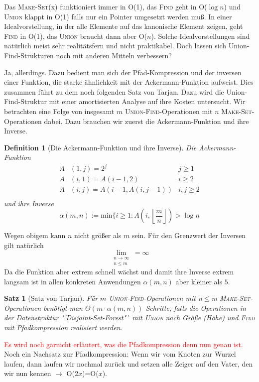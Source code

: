 \documentclass[ngerman,draft,parskip=half*,twoside]{scrreprt}
\theoremstyle{break}
\newtheorem{definition}{Definition}
\newtheorem{satz}{Satz}
\begin{document}
Das \textsc{Make-Set}(x) funktioniert immer in O(1), das \textsc{Find} geht in O($\log n$) und \textsc{Union} klappt in
O(1) falls nur ein Pointer umgesetzt werden muß. In einer Idealvorstellung, in der alle Elemente auf das kanonische
Element zeigen, geht \textsc{Find} in O(1), das \textsc{Union} braucht dann aber O($n$). Solche Idealvorstellungen sind
natürlich meist sehr realitätsfern und nicht praktikabel. Doch lassen sich Union-Find-Strukturen noch mit anderen
Mitteln verbessern?

Ja, allerdings. Dazu bedient man sich der Pfad-Kompression und der inversen einer Funktion, die starke ähnlichkeit mit
der Ackermann-Funktion aufweist. Dies zusammen führt zu dem noch folgenden Satz von Tarjan. Dazu wird die
Union-Find-Struktur mit einer amortisierten Analyse auf ihre Kosten untersucht. Wir betrachten eine Folge von insgesamt 
$m$ \textsc{Union-Find}-Operationen mit $n$ \textsc{Make-Set}-Operationen dabei. Dazu brauchen wir zuerst die
Ackermann-Funktion und ihre Inverse.
\begin{definition}[Die Ackermann-Funktion und ihre Inverse]
 Die Ackermann-Funktion
 \begin{align*}
 A&(1,j)=2^j   & j\geq 1\\
 A&(i,1)=A(i-1,2)   & i\geq 2\\
 A&(i,j)=A(i-1, A(i,j-1))   & i,j \geq 2\\
 \end{align*}
 und ihre Inverse
 \[\alpha(m,n):=\mbox{min}\{i \geq 1 : A\left(i,\left\lfloor\frac{m}{n}\right\rfloor\right)> \log n\]
\end{definition}
Wegen obigem kann $n$ nicht größer als $m$ sein. Für den Grenzwert der Inversen gilt natürlich
\[\lim_{\substack{n \rightarrow \infty \\n \leq m }}=\infty\]
Da die Funktion aber extrem schnell wächst und damit ihre Inverse extrem langsam ist in allen konkreten Anwendungen 
$\alpha (m,n)$ aber kleiner als $5$. 

\begin{satz}[Satz von Tarjan]
Für $m$ \textsc{Union-Find}-Operationen mit n$\leq$m \textsc{Make-Set}-Operationen benötigt man $\Theta( m \cdot
\alpha(m,n))$ Schritte, falls die Operationen in der Datenstruktur "'Disjoint-Set-Forest"` mit \textsc{Union} nach
Größe (Höhe) und \textsc{Find} mit Pfadkompression realisiert werden.
\end{satz}
\textcolor{red}{Es wird noch garnicht erläutert, was die Pfadkompression denn nun genau ist.}
Noch ein Nachsatz zur Pfadkompression: Wenn wir vom Knoten zur Wurzel laufen, dann laufen wir nochmal zurück und setzen
alle Zeiger auf den Vater, den wir nun kennen $\rightarrow$ O(2$x$)=O($x$).
\end{document}
